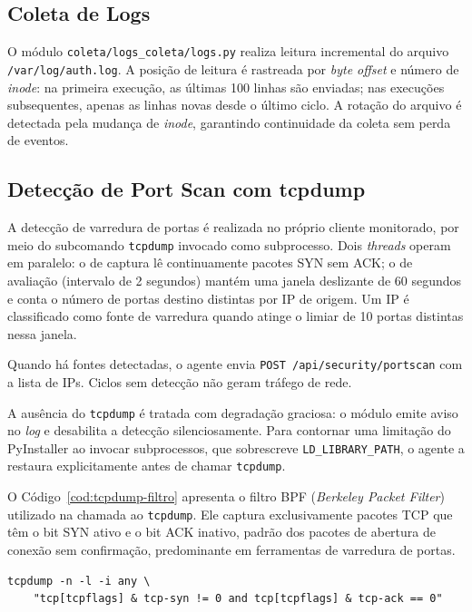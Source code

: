 \documentclass[
    12pt
    ,oneside
    ,a4paper
    ,chapter=TITLE
    ,section=TITLE
    ,sumario=abnt-6027-2012]{abntex2}
\begin{document}
\subsection{Coleta de Logs}
\label{subsec:logs-agente}

O módulo \texttt{coleta/logs\_coleta/logs.py} realiza leitura incremental do arquivo
\texttt{/var/log/auth.log}. A posição de leitura é rastreada por \textit{byte offset}
e número de \textit{inode}: na primeira execução, as últimas 100 linhas são enviadas;
nas execuções subsequentes, apenas as linhas novas desde o último ciclo. A rotação do
arquivo é detectada pela mudança de \textit{inode}, garantindo continuidade da coleta
sem perda de eventos.

\subsection{Detecção de Port Scan com tcpdump}
\label{subsec:portscan-agente}

A detecção de varredura de portas é realizada no próprio cliente monitorado, por meio
do subcomando \texttt{tcpdump} invocado como subprocesso. Dois \textit{threads} operam
em paralelo: o de captura lê continuamente pacotes SYN sem ACK; o de avaliação
(intervalo de 2 segundos) mantém uma janela deslizante de 60 segundos e conta o número
de portas destino distintas por IP de origem. Um IP é classificado como fonte de
varredura quando atinge o limiar de 10 portas distintas nessa janela.

Quando há fontes detectadas, o agente envia \texttt{POST /api/security/portscan} com
a lista de IPs. Ciclos sem detecção não geram tráfego de rede.

A ausência do \texttt{tcpdump} é tratada com degradação graciosa: o módulo emite
aviso no \textit{log} e desabilita a detecção silenciosamente. Para contornar uma
limitação do PyInstaller ao invocar subprocessos, que sobrescreve
\texttt{LD\_LIBRARY\_PATH}, o agente a restaura explicitamente antes de chamar
\texttt{tcpdump}.

O Código~\ref{cod:tcpdump-filtro} apresenta o filtro BPF (\textit{Berkeley Packet
Filter}) utilizado na chamada ao \texttt{tcpdump}. Ele captura exclusivamente
pacotes TCP que têm o bit SYN ativo e o bit ACK inativo, padrão dos pacotes de
abertura de conexão sem confirmação, predominante em ferramentas de varredura de
portas.

\begin{codigo}[H]
\begin{lstlisting}
tcpdump -n -l -i any \
    "tcp[tcpflags] & tcp-syn != 0 and tcp[tcpflags] & tcp-ack == 0"
\end{lstlisting}
\end{codigo}
\end{document}
